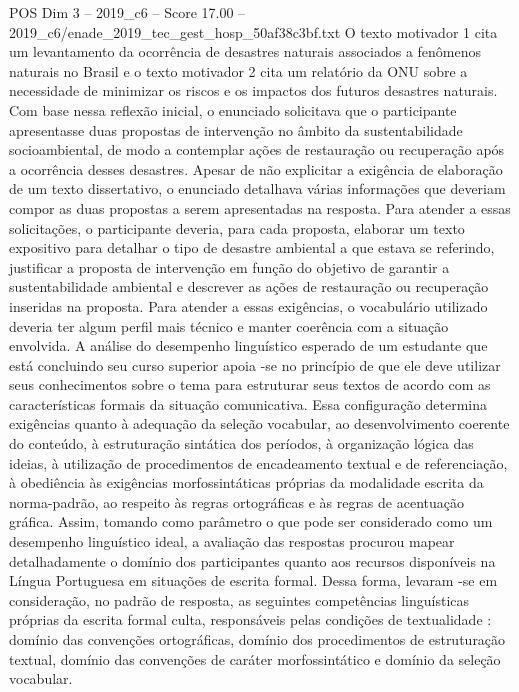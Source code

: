 \begin{textsample}{POS Dim 3 – 2019\_c6 – Score 17.00 – 2019\_c6/enade\_2019\_tec\_gest\_hosp\_50af38c3bf.txt}
O texto motivador 1 cita um levantamento da ocorrência de desastres naturais associados a fenômenos naturais no Brasil e o texto motivador 2 cita um relatório da ONU sobre a necessidade de minimizar os riscos e os impactos dos futuros desastres naturais.
Com base nessa reflexão inicial, o enunciado solicitava que o participante apresentasse duas propostas de intervenção no âmbito da sustentabilidade socioambiental, de modo a contemplar ações de restauração ou recuperação após a ocorrência desses desastres.
Apesar de não explicitar a exigência de elaboração de um texto dissertativo, o enunciado detalhava várias informações que deveriam compor as duas propostas a serem apresentadas na resposta.
Para atender a essas solicitações, o participante deveria, para cada proposta, elaborar um texto expositivo para detalhar o tipo de desastre ambiental a que estava se referindo, justificar a proposta de intervenção em função do objetivo de garantir a sustentabilidade ambiental e descrever as ações de restauração ou recuperação inseridas na proposta.
Para atender a essas exigências, o vocabulário utilizado deveria ter algum perfil mais técnico e manter coerência com a situação envolvida.
A análise do desempenho linguístico esperado de um estudante que está concluindo seu curso superior apoia -se no princípio de que ele deve utilizar seus conhecimentos sobre o tema para estruturar seus textos de acordo com as características formais da situação comunicativa.
Essa configuração determina exigências quanto à adequação da seleção vocabular, ao desenvolvimento coerente do conteúdo, à estruturação sintática dos períodos, à organização lógica das ideias, à utilização de procedimentos de encadeamento textual e de referenciação, à obediência às exigências morfossintáticas próprias da modalidade escrita da norma-padrão, ao respeito às regras ortográficas e às regras de acentuação gráfica.
Assim, tomando como parâmetro o que pode ser considerado como um desempenho linguístico ideal, a avaliação das respostas procurou mapear detalhadamente o domínio dos participantes quanto aos recursos disponíveis na Língua Portuguesa em situações de escrita formal.
Dessa forma, levaram -se em consideração, no padrão de resposta, as seguintes competências linguísticas próprias da escrita formal culta, responsáveis pelas condições de textualidade : domínio das convenções ortográficas, domínio dos procedimentos de estruturação textual, domínio das convenções de caráter morfossintático e domínio da seleção vocabular.

\end{textsample}
